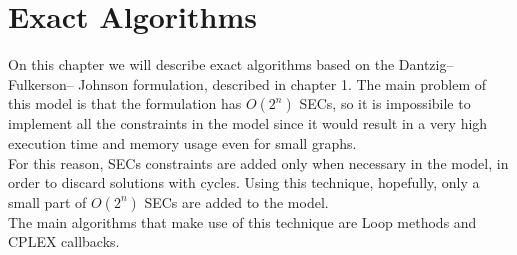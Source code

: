 \chapter{Exact Algorithms}

On this chapter we will describe exact algorithms based on the Dantzig–Fulkerson– Johnson formulation, described in chapter 1. The main problem of this model is that the formulation has $O(2^n)$ SECs, so it is impossibile to implement all the constraints in the model since it would result in a very high execution time and memory usage even for small graphs.
\\ For this reason, SECs constraints are added only when necessary in the model, in order to discard solutions with cycles. Using this technique, hopefully, only a small part of $O(2^n)$ SECs are added to the model.
\\ The main algorithms that make use of this technique are Loop methods and CPLEX callbacks.